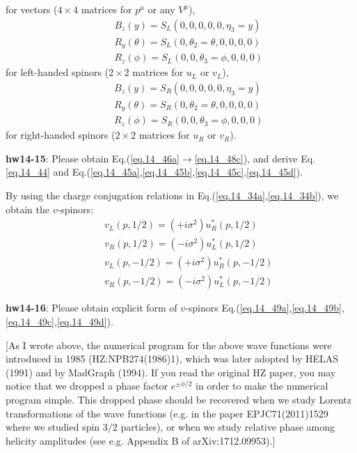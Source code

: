 \documentclass[12pt]{article}
\begin{document}
   for vectors ($4\times 4$ matrices for $p^\mu$ or any $V^\mu$),
\begin{eqnarray}
  && B_z(y)      = S_L(0,0,0,0,0,\eta_3=y)  \label{eq.14_47a} \\
  && R_y(\theta) = S_L(0,\theta_2=\theta,0,0,0,0) \label{eq.14_47b} \\
  && R_z(\phi)   = S_L(0,0,\theta_3=\phi,0,0,0) \label{eq.14_47c}
\end{eqnarray}
  for left-handed spinors ($2\times 2$ matrices for $u_L$ or $v_L$),
\begin{eqnarray}
  && B_z(y)      = S_R(0,0,0,0,0,\eta_3=y) \label{eq.14_48a} \\
  && R_y(\theta) = S_R(0,\theta_2=\theta,0,0,0,0) \label{eq.14_48b} \\
  && R_z(\phi)   = S_R(0,0,\theta_3=\phi,0,0,0) \label{eq.14_48c}
\end{eqnarray}
  for right-handed spinors ($2\times 2$ matrices for $u_R$ or $v_R$).

{\bf hw14-15}: Please obtain Eq.(\ref{eq.14_46a}$\to$\ref{eq.14_48c}), and derive Eq.\ref{eq.14_44} and Eq.(\ref{eq.14_45a},\ref{eq.14_45b},\ref{eq.14_45c},\ref{eq.14_45d}).

  By using the charge conjugation relations in Eq.(\ref{eq.14_34a},\ref{eq.14_34b}), we obtain the $v$-spinors:
\begin{eqnarray}
  && v_L(p, 1/2) = (+i\sigma^2) u_R^*(p, 1/2) \label{eq.14_49a} \\
  && v_R(p, 1/2) = (-i\sigma^2) u_L^*(p, 1/2) \label{eq.14_49b} \\
  && v_L(p,-1/2) = (+i\sigma^2) u_R^*(p,-1/2) \label{eq.14_49c} \\
  && v_R(p,-1/2) = (-i\sigma^2) u_L^*(p,-1/2) \label{eq.14_49d} 
\end{eqnarray}

{\bf hw14-16}: Please obtain explicit form of $v$-spinors Eq.(\ref{eq.14_49a},\ref{eq.14_49b},\ref{eq.14_49c},\ref{eq.14_49d}).

  [As I wrote above, the numerical program for the above wave functions
  were introduced in 1985 (HZ:NPB274(1986)1), which was later adopted
  by HELAS (1991) and by MadGraph (1994).  If you read the original
  HZ paper, you may notice that we dropped a phase factor $e^{\pm \phi/2}$
  in order to make the numerical program simple.  This dropped phase
  should be recovered when we study Lorentz transformations of the wave
  functions (e.g. in the paper EPJC71(2011)1529 where we studied spin
  $3/2$ particles), or when we study relative phase among helicity
  amplitudes (see e.g. Appendix B of arXiv:1712.09953).]
\end{document}
